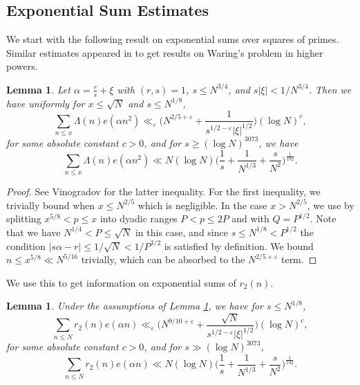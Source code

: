 \documentclass[12pt]{amsart}
\newtheorem{lem}[thm]{Lemma}
\theoremstyle{definition}
\theoremstyle{definition}
\theoremstyle{remark}
\numberwithin{equation}{section}
\renewcommand{\geq}{\geqslant}
\renewcommand{\leq}{\leqslant}
\begin{document}
\subsection{Exponential Sum Estimates}
We start with the following result on exponential sums over squares of primes. Similar estimates appeared in \cite{MR1829558} to get results on Waring's problem in higher powers.
\begin{lem}\label{trigonometric_sum_over_primes}
Let $\alpha=\frac{r}{s} +\xi$ with $(r,s)=1$, $s\leq N^{3/4}$, and $s|\xi|<1/N^{3/4}$. Then we have uniformly for $x\leq \sqrt{N}$ and $s \leq N^{1/8}$,
\begin{equation*}
\sum_{n\leq x} \Lambda(n) e(\alpha n^2) \ll_{\varepsilon} \bigg( N^{2/5+\varepsilon} + \frac{1}{s^{1/2-\varepsilon}|\xi|^{1/2}} \bigg) (\log N)^c , \tag{i}
\end{equation*}
for some absolute constant $c>0$, and for $s\geq (\log N)^{3073}$, we have
\begin{equation*}
\sum_{n\leq x} \Lambda(n) e(\alpha n^2) \ll N (\log N) \bigg( \frac{1}{s} + \frac{1}{N^{1/3}}+ \frac{s}{N^2}  \bigg)^{\frac{1}{192}} . \tag{ii}
\end{equation*}
\end{lem}
\begin{proof}
See Vinogradov \cite{zbMATH02517953} for the latter inequality. For the first inequality, we trivially bound when $x\leq N^{2/5}$ which is negligible. In the case $x> N^{2/5}$, we use \cite[Theorem 2]{MR2252758} by splitting $x^{5/8}<p\leq x$ into dyadic ranges $P<p\leq 2P$ and with $Q=P^{1/2}$. Note that we have $N^{1/4}<P\leq \sqrt{N}$ in this case, and since $s\leq N^{1/8}<P^{1/2}$ the condition $|s\alpha - r| \leq 1/\sqrt{N}< 1/P^{3/2}$ is satisfied by definition. We bound $n\leq x^{5/8} \ll N^{5/16}$ trivially, which can be absorbed to the $N^{2/5+\varepsilon}$ term.
\end{proof}
We use this to get information on exponential sums of $r_2(n)$.
\begin{lem}\label{exponential_sum_of_r_2}
Under the assumptions of Lemma \ref{trigonometric_sum_over_primes}, we have for $s\leq N^{1/8}$,
\begin{equation*}
\sum_{n\leq N} r_2(n) e(\alpha n)    \ll_{\varepsilon} \bigg( N^{9/10+\varepsilon} + \frac{\sqrt{N}}{s^{1/2-\varepsilon}|\xi|^{1/2}} \bigg) (\log N)^c  ,\tag{i}
\end{equation*}
for some absolute constant $c>0$, and for $s\gg (\log N)^{3073}$,
\begin{equation*}
\sum_{n\leq N} r_2(n) e(\alpha n) \ll N (\log N)\bigg( \frac{1}{s}+ \frac{1}{N^{1/3}} + \frac{s}{N^2} \bigg)^{\frac{1}{192}} . \tag{ii}
\end{equation*}
\end{lem}
\end{document}
